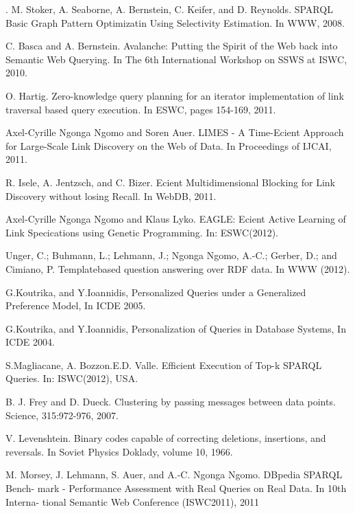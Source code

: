 \documentclass{sig-alternate}  %
\begin{document}
\begin{thebibliography}{10}
. M. Stoker, A. Seaborne, A. Bernstein, C. Keifer,
and D. Reynolds. SPARQL Basic Graph Pattern Optimizatin Using Selectivity
Estimation. In WWW, 2008.

C. Basca and A. Bernstein. Avalanche: Putting the
Spirit of the Web back into Semantic Web Querying. In The 6th International
Workshop on SSWS at ISWC, 2010.

O. Hartig. Zero-knowledge query planning for an iterator
implementation of link traversal based query execution. In ESWC, pages
154-169, 2011.

Axel-Cyrille Ngonga Ngomo and Soren Auer. LIMES -
A Time-Ecient Approach for Large-Scale Link Discovery on the Web of
Data. In Proceedings of IJCAI, 2011.

 R. Isele, A. Jentzsch, and C. Bizer. Ecient Multidimensional
Blocking for Link Discovery without losing Recall. In WebDB, 2011.

Axel-Cyrille Ngonga Ngomo and Klaus Lyko. EAGLE:
Ecient Active Learning of Link Specications using Genetic Programming.
In: ESWC(2012).

Unger, C.; Buhmann, L.; Lehmann, J.; Ngonga Ngomo,
A.-C.; Gerber, D.; and Cimiano, P. Templatebased question answering
over RDF data. In WWW (2012).

G.Koutrika, and Y.Ioannidis, Personalized Queries
under a Generalized Preference Model, In ICDE 2005.

G.Koutrika, and Y.Ioannidis, Personalization of Queries
in Database Systems, In ICDE 2004.

S.Magliacane, A. Bozzon.E.D. Valle. Efficient Execution
of Top-k SPARQL Queries. In: ISWC(2012), USA. 

B. J. Frey and D. Dueck. Clustering by passing messages
between data points. Science, 315:972-976, 2007.

\bibitem{key-37}{]} V. Levenshtein. Binary codes capable of correcting
deletions, insertions, and reversals. In Soviet Physics Doklady, volume
10, 1966.

M. Morsey, J. Lehmann, S. Auer, and A.-C. {Ngonga Ngomo}.
DBpedia SPARQL Bench- mark - Performance Assessment with Real Queries
on Real Data. In 10th Interna- tional Semantic Web Conference (ISWC2011),
2011\end{thebibliography}
\end{document}
